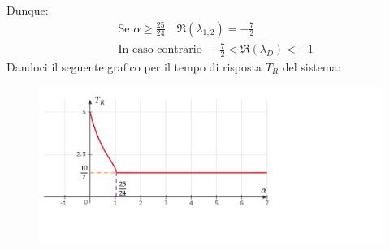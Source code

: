 \documentclass[a4paper]{report}
\begin{document}
Dunque:
\begin{align*}
&\text{Se } \alpha \geq\frac{25}{24} \quad \Re(\lambda_{1,2})=-\frac{7}{2}\\
&\text{In caso contrario } -\frac{7}{2}<\Re(\lambda_D)<-1
\end{align*}
Dandoci il seguente grafico per il tempo di risposta $T_R$ del sistema:
\begin{center}
\begin{figure}[h]
\includegraphics[width=\textwidth]{diagtd}
\end{figure}
\end{center}
\newpage
\end{document}
